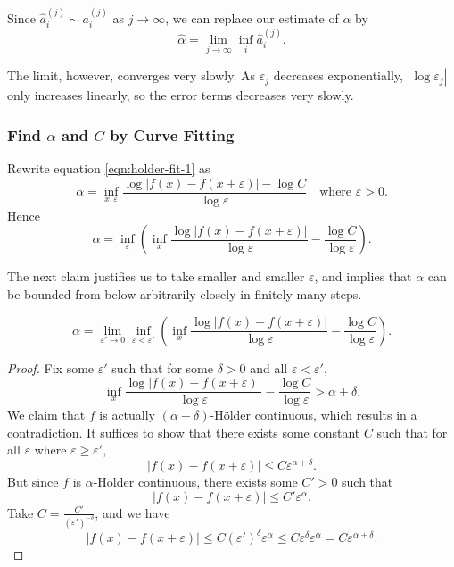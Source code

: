 Since $\hat{a}_i^{(j)} \sim a_i^{(j)}$ as $j \to  \infty $, we can replace our estimate of $\alpha$ by
	\[
		\hat{\alpha}  = \lim_{j \to \infty} \operatorname{inf}_i \hat{a} _i^{(j)}
	.\] 

	The limit, however, converges very slowly. As $\varepsilon_j$ decreases exponentially, $\left| \log \varepsilon_j \right| $ only increases linearly, so the error terms decreases very slowly.

\subsubsection{Find $\alpha$ and $C$ by Curve Fitting}

	Rewrite equation \eqref{eqn:holder-fit-1} as
	\[
		\alpha 
		= \operatorname{inf}_{x, \varepsilon} \frac{\log \left| f(x) - f(x+\varepsilon) \right| - \log C}{\log \varepsilon}
		\quad\text{where }\varepsilon>0
	.\]
Hence
\[
		\alpha 
		= \operatorname{inf}_{\varepsilon}
		\left( \operatorname{inf}_x
		\frac{\log \left| f(x) - f(x+\varepsilon) \right|}{\log \varepsilon}
-\frac{\log C}{\log \varepsilon} \right) 
	.\]

The next claim justifies us to take smaller and smaller $\varepsilon$, and implies that $\alpha$ can be bounded from below arbitrarily closely in finitely many steps.
\begin{proposition}
\[
		\alpha 
		=\lim_{\varepsilon' \to  0}
		\operatorname{inf}_{\varepsilon<\varepsilon'}
		\left( \operatorname{inf}_x
		\frac{\log \left| f(x) - f(x+\varepsilon) \right|}{\log \varepsilon}
-\frac{\log C}{\log \varepsilon} \right) 
	.\]
\end{proposition}
\begin{proof}
	Fix some $\varepsilon'$ such that 
	for some $\delta>0$ and all $\varepsilon < \varepsilon'$, \[
		 \operatorname{inf}_x
		\frac{\log \left| f(x) - f(x+\varepsilon) \right|}{\log \varepsilon}
-\frac{\log C}{\log \varepsilon} 
> \alpha + \delta
	.\] 
	We claim that $f$ is actually $(\alpha + \delta)$-Hölder continuous, which results in a contradiction. It suffices to show that there exists some constant $C$ such that for all $\varepsilon$ where $\varepsilon\ge \varepsilon'$, \[
		\left| f(x) - f(x+\varepsilon) \right| \le C \varepsilon^{\alpha+\delta}
	.\] 
But since $f$ is $\alpha$-Hölder continuous, there exists some $C'>0$ such that
\[
		\left| f(x) - f(x+\varepsilon) \right| \le C' \varepsilon^{\alpha}
.\] 
Take $C = \frac{C'}{(\varepsilon')^{-\delta}}$, and we have
\[
		\left| f(x) - f(x+\varepsilon) \right| \le C (\varepsilon')^{\delta} \varepsilon^{\alpha}
		\le C \varepsilon^{\delta} \varepsilon^{\alpha}
		= C \varepsilon^{\alpha+\delta}
.\]

\end{proof}

